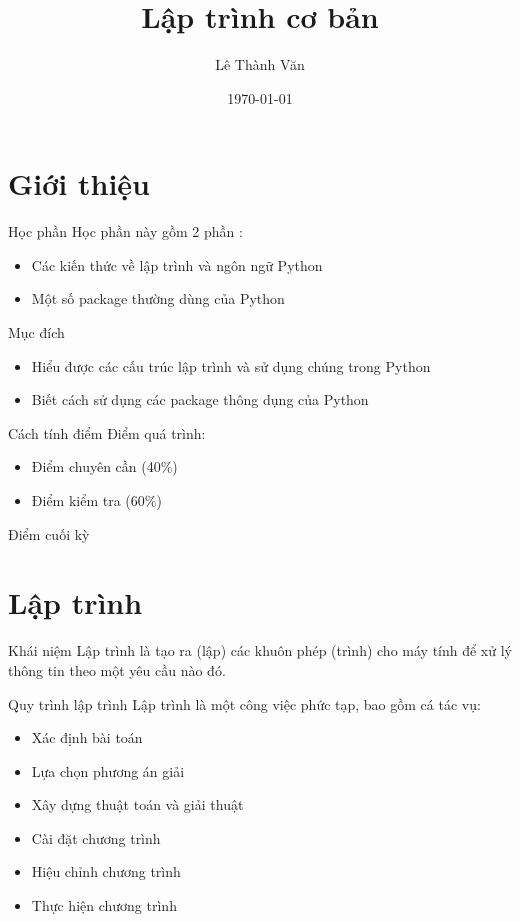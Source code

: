 \documentclass[11pt]{beamer}
\author{Lê Thành Văn}
\title{Lập trình cơ bản}
\institute{Khoa Hệ thống thông tin quản lý}
\date{\today}
\begin{document}
\begin{frame}
\titlepage
\end{frame}
\section{Giới thiệu}
  \begin{frame}{Học phần}
    Học phần này gồm 2 phần :
    \begin{itemize}
      \item Các kiến thức về lập trình và ngôn ngữ Python
      \item Một số package thường dùng của Python
    \end{itemize}
  \end{frame}

  \begin{frame}{Mục đích}
    \begin{itemize}
      \item Hiểu được các cấu trúc lập trình và sử dụng chúng trong Python
      \item Biết cách sử dụng các package thông dụng của Python
    \end{itemize}
  \end{frame}

  \begin{frame}{Cách tính điểm}
    Điểm quá trình:
    \begin{itemize}
      \item Điểm chuyên cần (40\%)
      \item Điểm kiểm tra (60\%)
    \end{itemize}
    Điểm cuối kỳ
  \end{frame}

\section{Lập trình}
  \begin{frame}{Khái niệm}
    Lập trình là tạo ra (lập) các khuôn phép (trình) cho máy tính để xử lý thông tin theo một yêu cầu nào đó.
  \end{frame}

  \begin{frame}{Quy trình lập trình}
    Lập trình là một công việc phức tạp, bao gồm cá tác vụ:
    \begin{itemize}
      \item Xác định bài toán
      \item Lựa chọn phương án giải
      \item Xây dựng thuật toán và giải thuật
      \item Cài đặt chương trình
      \item Hiệu chỉnh chương trình
      \item Thực hiện chương trình
    \end{itemize}
  \end{frame}
\end{document}
